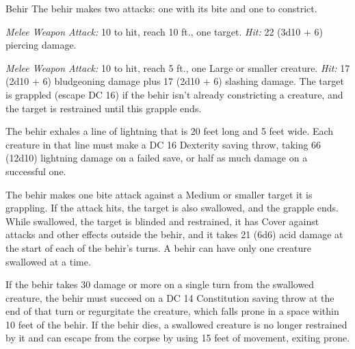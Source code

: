 \documentclass[10pt,a4paper,twoside,bg=print,twocolumn,openany,nodeprecatedcode]{dndbook}
\begin{document}
\begin{DndMonster}[float=t]{Behir}
\DndMonsterBasics[
armor-class = {17 (natural armor)},
hit-points = {\DndDice{16d12 + 64}},
speed = {50 ft., climb 40 ft.}
]
\DndMonsterAbilityScores[
 str = 23,
 dex = 16,
 con = 18,
 int = 7,
 wis = 14,
 cha = 12
]
\DndMonsterDetails[
skills = {Perception +6, Stealth +7},
damage-immunities = {lightning},
senses = {darkvision 90 ft., passive perception 16},
languages = {Draconic},
challenge = 11,
]
The behir makes two attacks: one with its bite and one to constrict.

\textsl{Melee Weapon Attack:} 10 to hit, reach 10 ft., one target. \textsl{Hit:} 22 (3d10 + 6) piercing damage.

\textsl{Melee Weapon Attack:} 10 to hit, reach 5 ft., one Large or smaller creature. \textsl{Hit:} 17 (2d10 + 6) bludgeoning damage plus 17 (2d10 + 6) slashing damage. The target is grappled (escape DC 16) if the behir isn't already constricting a creature, and the target is restrained until this grapple ends.

The behir exhales a line of lightning that is 20 feet long and 5 feet wide. Each creature in that line must make a DC 16 Dexterity saving throw, taking 66 (12d10) lightning damage on a failed save, or half as much damage on a successful one.

The behir makes one bite attack against a Medium or smaller target it is grappling. If the attack hits, the target is also swallowed, and the grapple ends. While swallowed, the target is blinded and restrained, it has Cover against attacks and other effects outside the behir, and it takes 21 (6d6) acid damage at the start of each of the behir's turns. A behir can have only one creature swallowed at a time.

If the behir takes 30 damage or more on a single turn from the swallowed creature, the behir must succeed on a DC 14 Constitution saving throw at the end of that turn or regurgitate the creature, which falls prone in a space within 10 feet of the behir. If the behir dies, a swallowed creature is no longer restrained by it and can escape from the corpse by using 15 feet of movement, exiting prone.

\end{DndMonster}
\end{document}
